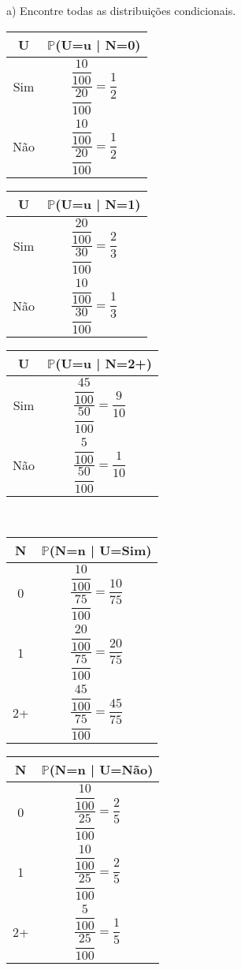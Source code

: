 \documentclass[12pt,a4paper,draft]{article}
\begin{document}
	\vspace{0.5cm}
	a) Encontre todas as distribuições condicionais.
	\vspace{1cm}
	\begin{center}
		\begin{tabular}{cc} \midrule
			U & $\mathbb{P}$(U=u | N=0)\\ \midrule
			Sim & $\dfrac{\dfrac{10}{100}}{\dfrac{20}{100}} = \dfrac{1}{2}$\\ \midrule
			Não & $\dfrac{\dfrac{10}{100}}{\dfrac{20}{100}} = \dfrac{1}{2}$\\ \midrule
		\end{tabular}
		\hspace{1cm}
		\begin{tabular}{cc} \midrule
			U & $\mathbb{P}$(U=u | N=1)\\ \midrule
			Sim & $\dfrac{\dfrac{20}{100}}{\dfrac{30}{100}} = \dfrac{2}{3}$\\ \midrule
			Não & $\dfrac{\dfrac{10}{100}}{\dfrac{30}{100}} = \dfrac{1}{3}$\\ \midrule
		\end{tabular}
		\hspace{1cm}
		\begin{tabular}{cc} \midrule
			U & $\mathbb{P}$(U=u | N=2+)\\ \midrule
			Sim & $\dfrac{\dfrac{45}{100}}{\dfrac{50}{100}} = \dfrac{9}{10}$\\ \midrule
			Não & $\dfrac{\dfrac{5}{100}}{\dfrac{50}{100}} = \dfrac{1}{10}$\\ \midrule
		\end{tabular}
		\vspace{1cm}\\
		\begin{tabular}{cc} \midrule
			N & $\mathbb{P}$(N=n | U=Sim)\\ \midrule
			0 & $\dfrac{\dfrac{10}{100}}{\dfrac{75}{100}} = \dfrac{10}{75}$\\ \midrule
			1 & $\dfrac{\dfrac{20}{100}}{\dfrac{75}{100}} = \dfrac{20}{75}$\\ \midrule
			2+ & $\dfrac{\dfrac{45}{100}}{\dfrac{75}{100}} = \dfrac{45}{75}$\\ \midrule
		\end{tabular}
		\hspace{1cm}
		\begin{tabular}{cc} \midrule
			N & $\mathbb{P}$(N=n | U=Não)\\ \midrule
			0 & $\dfrac{\dfrac{10}{100}}{\dfrac{25}{100}} = \dfrac{2}{5}$\\ \midrule
			1 & $\dfrac{\dfrac{10}{100}}{\dfrac{25}{100}} = \dfrac{2}{5}$\\ \midrule
			2+ & $\dfrac{\dfrac{5}{100}}{\dfrac{25}{100}} = \dfrac{1}{5}$\\ \midrule
		\end{tabular}		
	\end{center}
\end{document}
